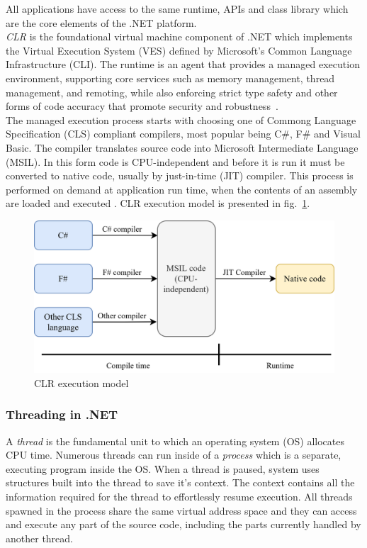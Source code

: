 All applications have access to the same runtime, APIs and class library which are the core elements of the .NET platform.\\

\emph{CLR} is the foundational virtual machine component of .NET which implements the Virtual Execution System (VES) defined by Microsoft's Common Language Infrastructure (CLI). The runtime is an agent that provides a managed execution environment, supporting core services such as memory management, thread management, and remoting, while also enforcing strict type safety and other forms of code accuracy that promote security and robustness~\cite{IntroductionToNet}.\\

The managed execution process starts with choosing one of Commong Language Specification (CLS) compliant compilers, most popular being C\#, F\# and Visual Basic. The compiler translates source code into Microsoft Intermediate Language (MSIL). In this form code is CPU-independent and before it is run it must be converted to native code, usually by just-in-time (JIT) compiler. This process is performed on demand at application run time, when the contents of an assembly are loaded and executed \cite{ManagedExecution}.
CLR execution model is presented in fig.~\ref{fig:clr}.

\begin{figure}[htb]
	\centering
		\includegraphics[scale=1.0]{figures02/clr.png}
	\caption{CLR execution model}
	\label{fig:clr}
\end{figure}


\subsubsection{Threading in .NET}
A \emph{thread} is the fundamental unit to which an operating system (OS) allocates CPU time. Numerous threads can run inside of a \emph{process} which is a separate, executing program inside the OS.
When a thread is paused, system uses structures built into the thread to save it's context. The context contains all the information required for the thread to effortlessly resume execution. All threads spawned in the process share the same virtual address space and they can access and execute any part of the source code, including the parts currently handled by another thread.

